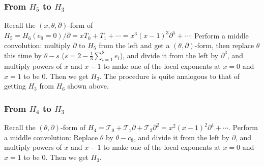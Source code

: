 \documentclass[a4paper,12pt]{article}
\theoremstyle{definition}
\theoremstyle{remark}
\numberwithin{equation}{section} %
\begin{document}
 \subsubsection{From $H_5$ to $H_3$}\label{fromH5toH3}
 Recall the $(x,\theta,\partial)$-form of
$H_5=H_6(e_9=0)/\partial=x\overline{T}_0+\overline{T}_1+\cdots=x^3(x-1)^3\partial^5+\cdots$:
Perform a middle convolution:
multiply $\partial$ to $H_5$ from the left
and get a $(\theta,\partial)$-form,
then  replace $\theta$ this time by $\theta-s$ ($s=2-\frac13\sum_{i=1}^8e_i$),
and divide it from the left by $\partial^3$, and multiply powers of $x$ and $x-1$ to make one of the local exponents at $x=0$ and $x=1$ to be 0. Then we get $H_3$.
The procedure is quite analogous to that
of getting $H_3$ from $H_6$ shown above.
\subsubsection{From $H_4$ to $H_3$}\label{fromH4toH3}
Recall the $(\theta,\partial)$-form of
$H_4=\mathcal T_0+\mathcal T_1\partial+\mathcal T_2\partial^2=x^2(x-1)^2\partial^4+\cdots$.
Perform a middle convolution: Replace $\theta$  by $\theta-c_8$,  
and divide it from the left by $\partial$, and multiply powers of $x$ and $x-1$ to make one of the local exponents at $x=0$ and $x=1$ to be 0. Then we get $H_3$.


 
\end{document}
